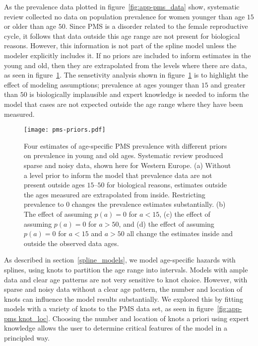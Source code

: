 As the prevalence data plotted in figure~\ref{fig:app-pms_data} show,
systematic review collected no data on population prevalence for women
younger than age $15$ or older than age $50$.  Since PMS is a disorder
related to the female reproductive cycle, it follows that data outside
this age range are not present for biological reasons.  However, this
information is not part of the spline model unless the modeler
explicitly includes it.  If no priors are included to inform estimates
in the young and old, then they are extrapolated from the levels where
there are data, as seen in figure~\ref{fig:app-pms prios_on_level}.  The
sensetivity analysis shown in figure~\ref{fig:app-pms prios_on_level} is
to highlight the effect of modeling assumptions; prevalence at ages
younger than $15$ and greater than $50$ is biologically implausible and
expert knowledge is needed to inform the model that cases are not
expected outside the age range where they have been measured.

    \begin{figure}
        \begin{center}
            \texttt{[image: pms-priors.pdf]}
        \end{center}
        \caption[Four estimates of age-specific PMS prevalence with
          different priors on prevalence in young and old ages.]{Four
          estimates of age-specific PMS prevalence with different
          priors on prevalence in young and old ages.  Systematic
          review produced sparse and noisy data, shown here for
          Western Europe.  (a) Without a level prior to inform the
          model that prevalence data are not present outside
          ages $15$--$50$ for biological reasons, estimates outside the
          ages measured are extrapolated from inside.  Restricting
          prevalence to $0$ changes the prevalence estimates
          substantially. (b) The effect of assuming $p(a) = 0$ for
          $a<15$, (c) the effect of assuming $p(a) = 0$ for $a>50$,
          and (d) the effect of assuming $p(a) = 0$ for $a<15$ and
          $a>50$ all change the estimates inside and outside the
          observed data ages.}
        \label{fig:app-pms prios_on_level}
    \end{figure}


As described in
section~\ref{spline_models}, we model
age-specific hazards with splines, using knots to partition the age
range into intervals.  Models with ample data and clear age patterns
are not very sensitive to knot choice.  However, with sparse and
noisy data without a clear age pattern, the number and location of
knots can influence the model results substantially.  We explored this
by fitting models with a variety of knots to the PMS data set, as seen
in figure~\ref{fig:app-pms knot_loc}.  Choosing the number and
location of knots a priori using expert knowledge allows the user to
determine critical features of the model in a principled way.

